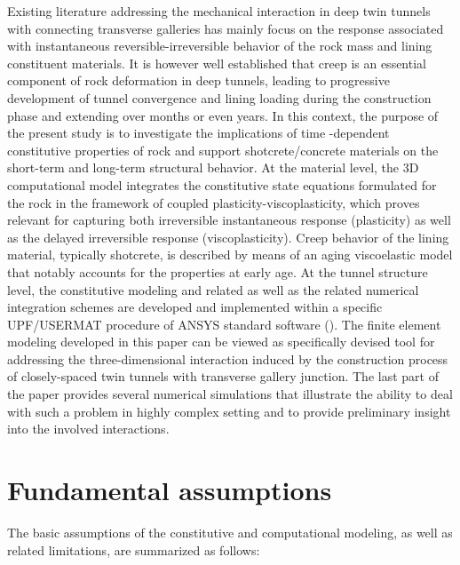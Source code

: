 \documentclass[Journal,letterpaper, NoLists,SectionNumbers]{ascelike-new}
\begin{document}
Existing literature addressing the mechanical interaction in deep twin tunnels with connecting transverse galleries has mainly focus on the response associated with instantaneous reversible-irreversible behavior of the rock mass and lining constituent materials. It is however well established that creep is an essential component of rock deformation in deep tunnels, leading to progressive development of tunnel convergence and lining loading during the construction phase and extending over months or even years.  In this context, the purpose of the present study is to investigate the implications of time -dependent constitutive properties of rock and support shotcrete/concrete materials on the short-term and long-term structural behavior.  At the material level, the 3D computational model integrates the constitutive state equations formulated for the rock in the framework of coupled plasticity-viscoplasticity, which proves relevant for capturing both irreversible instantaneous response (plasticity) as well as the delayed irreversible response (viscoplasticity). Creep behavior of the lining material, typically shotcrete, is described by means of an aging viscoelastic model that notably accounts for the properties at early age. At the tunnel structure level, the constitutive modeling and related as well as the related numerical integration schemes are developed and implemented within a specific UPF/USERMAT procedure of ANSYS standard software (). The finite element modeling developed in this paper can be viewed as specifically devised tool for addressing the three-dimensional interaction induced by the construction process of closely-spaced twin tunnels with transverse gallery junction. The last part of the paper provides several numerical simulations that illustrate the ability to deal with such a problem in  highly complex setting and to provide preliminary insight into the  involved  interactions.


\section{Fundamental assumptions}\label{section_assumptions}

The basic assumptions of the constitutive and computational modeling, as well as related limitations, are summarized as follows:
\end{document}
